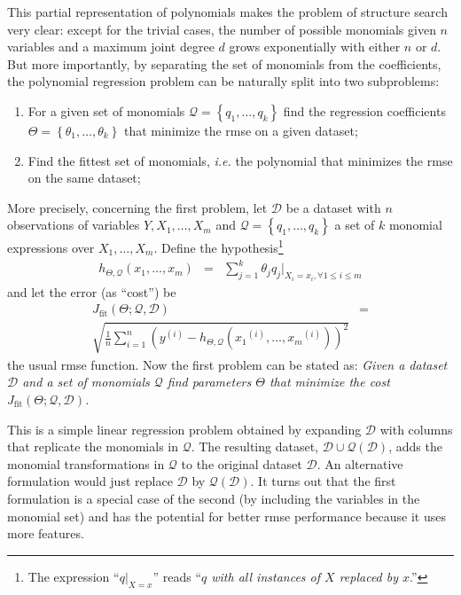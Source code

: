 \documentclass[review,preprint]{elsarticle}
\newcommand{\sample}[1]{\ensuremath{^{\left(#1\right)}}}
\newcommand{\revised}[2]{}
\begin{document}
This partial representation of polynomials makes the problem of structure search very clear: except for the trivial cases, the number of possible monomials given $n$ variables and a maximum joint degree $d$ grows exponentially with either $n$ or $d$. But more importantly, by separating the set of monomials from the coefficients, the polynomial regression problem can be naturally split into two subproblems:
%
\begin{enumerate}
\item For a given set of monomials $\mathcal{Q} = \left\lbrace q_1, \ldots, q_k\right\rbrace$ find the regression coefficients $\Theta = \left\lbrace \theta_1,\ldots,\theta_k \right\rbrace$ that minimize the \ac{rmse} on a given dataset;

\item Find the fittest set of monomials, \emph{i.e.} the polynomial that minimizes the \ac{rmse} on the same dataset;
\end{enumerate}
%
More precisely, concerning the first problem, let $\mathcal{D}$ be a dataset with $n$ observations of variables $Y, X_1,\ldots,X_m$ and $\mathcal{Q} = \left\lbrace q_1,\ldots, q_k\right\rbrace$ a set of $k$ monomial expressions over $X_1,\ldots,X_m$. Define the hypothesis\footnote{The expression ``$q|_{X=x}$'' reads ``\emph{$q$ with all instances of $X$ replaced by $x$}.''}
%
\begin{eqnarray}
h_{\Theta,\mathcal{Q}}\left(x_1,\ldots,x_m\right) &=& \sum_{j = 1}^k \theta_j q_j|_{X_i=x_i,\forall 1 \leq i \leq m}
\end{eqnarray}
%
and let the error (as ``cost'') be
%
\begin{eqnarray}
J_{\textrm{fit}}\left(\Theta;\mathcal{Q},\mathcal{D}\right)  & =  \nonumber \\
\sqrt{\frac{1}{n}\sum_{i=1}^n \left( y\sample{i} - h_{\Theta,\mathcal{Q}}\left( x_1\sample{i},\ldots,x_m\sample{i} \right) \right)^2 }\label{eq:rmse}
\end{eqnarray}
%
the usual \acf{rmse} function. Now the first problem can be stated as:
%
\emph{Given a dataset $\mathcal{D}$ and a set of monomials $\mathcal{Q}$ find parameters $\Theta$ that minimize the cost $J_{\textrm{fit}}\left(\Theta;\mathcal{Q},\mathcal{D}\right)$.}

%
This is a simple linear regression problem obtained by expanding $\mathcal{D}$ with columns that replicate the monomials in $\mathcal{Q}$. The resulting dataset, $\mathcal{D} \cup \mathcal{Q}\left( \mathcal{D} \right)$, adds the monomial transformations in $\mathcal{Q}$ to the original dataset $\mathcal{D}$. An alternative formulation would just replace $\mathcal{D}$ by $\mathcal{Q}\left( \mathcal{D} \right)$. It turns out that the first formulation is a special case of the second (by including the variables in the monomial set) and has the potential for better \ac{rmse} performance because it uses more features.\revised{How is this known??? Is there a reference or some experimental results backing this claim or is it simply intuition???}{We reformulated the previous sentence.}
\end{document}
